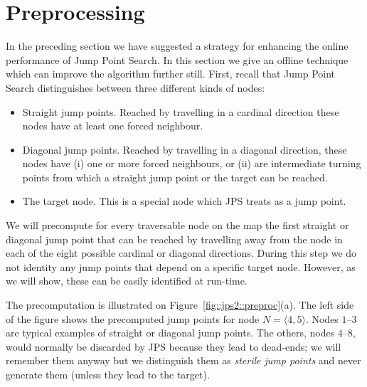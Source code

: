 \section{Preprocessing}
\label{sec::jps2::preprocessing}
In the preceding section we have suggested a strategy for enhancing the
online performance of Jump Point Search.  In this section we give an offline
technique which can improve the algorithm further still. First, recall that 
Jump Point Search distinguishes between three different kinds of
nodes:
\begin{itemize}
\item Straight jump points. Reached by travelling in a
cardinal direction these nodes have at least one forced neighbour.
\item Diagonal jump points. Reached by travelling in a diagonal direction, 
these nodes have (i) one or more forced neighbours, or (ii) are 
intermediate turning points from which a straight jump point or the 
target can be reached.
\item The target node. This is a special node which JPS treats as a jump point.
\end{itemize}

We will precompute for every traversable node on the map the first
straight or diagonal jump point that can be reached by travelling 
away from the node in each of the eight possible cardinal or diagonal 
directions. During this step we do not identity any jump points that 
depend on a specific target node.  However, as we will show, these 
can be easily identified at run-time. 




The precomputation is illustrated on Figure~\ref{fig::jps2::preproc}(a).
The left side of the figure shows the precomputed jump points 
for node $N = \langle 4,5\rangle$.  
Nodes $1$--$3$ are typical examples of straight or diagonal 
jump points.  
The others, nodes $4$--$8$, would normally be discarded 
by JPS because they lead to dead-ends; we will remember them 
anyway but we distinguish them as \emph{sterile jump points} and never
generate them (unless they lead to the target).

